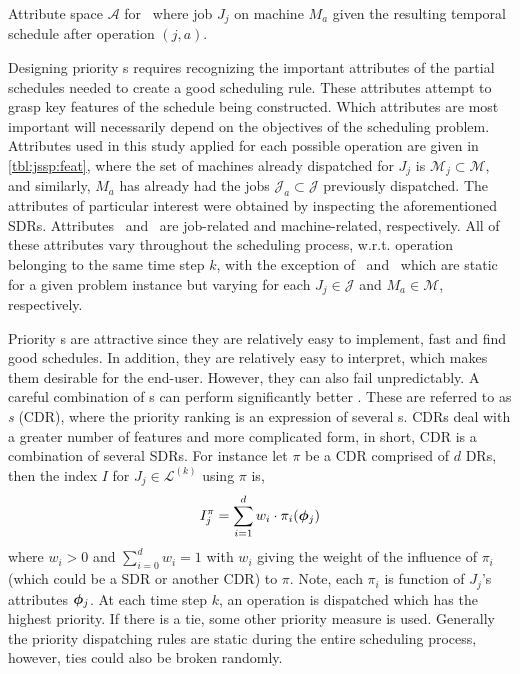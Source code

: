 \documentclass[smallextended]{svjour3}
\begin{document}
\begin{table}[t!] \centering
	\caption[Attribute space $\mathcal{A}$ for \JSP]{Attribute space 
	$\mathcal{A}$ for \JSP\ where job $J_j$ on machine $M_a$ given the 
	resulting temporal schedule after operation $(j,a)$.
	}
	\label{tbl:jssp:feat}
	
\end{table}

Designing priority \dr s requires recognizing the important 
attributes of the partial schedules needed to create a good scheduling rule. 
These attributes attempt to grasp key features of the schedule being 
constructed. Which attributes are most important will necessarily depend on the
objectives of the scheduling problem. Attributes used in this study applied for 
each possible operation are given in \cref{tbl:jssp:feat}, where the set of 
machines already dispatched for $J_j$ is $\mathcal{M}_j\subset\mathcal{M}$, 
and similarly, $M_a$ has already had the jobs $\mathcal{J}_a\subset\mathcal{J}$ 
previously dispatched.
The attributes of particular interest were obtained by inspecting the 
aforementioned SDRs. Attributes \phiJobRelated\ and \phiMacRelated\ are 
job-related and machine-related, respectively.
All of these attributes vary throughout the scheduling process, w.r.t. 
operation belonging to the same time step $k$, with the exception of 
\phijobTotProcTime\ and \phimacTotProcTime\ which are static for a given 
problem instance but varying for each $J_j\in\mathcal{J}$ and 
$M_a\in\mathcal{M}$, respectively. 

Priority \dr s are attractive since they are relatively easy to 
implement, 
fast and find good schedules. In addition, they are relatively easy to 
interpret, which makes them desirable for the end-user.
However, they can also fail unpredictably. 
A careful combination of \dr s can perform significantly better 
\cite{Jayamohan04}. These are referred to as \emph{\cdr s} 
(CDR), where the priority ranking is an expression of several \sdr s. 
CDRs deal with a greater number of features and 
more complicated form, in short, CDR is a combination of several SDRs. For 
instance let $\pi$ be a CDR comprised of $d$ DRs, then 
the index $I$ for $J_j\in\mathcal{L}^{(k)}$ using $\pi$ is, 
\begin{equation}
	I_j^{\pi} = \sum_{i=1}^d w_i \cdot \pi_i(\bm{\phi}_j) \label{eq:CDR}
\end{equation}
where $w_i>0$ and $\sum_{i=0}^d w_i = 1$ with $w_i$ giving the weight of the 
influence of $\pi_i$ (which could be a SDR or another CDR) to $\pi$. Note, 
each $\pi_i$ is function of $J_j$'s attributes $\bm{\phi}_j$.  
At each time step $k$, an operation is dispatched which has the highest 
priority.  If there is a 
tie, some other priority measure is used. Generally the priority dispatching 
rules are static during the entire scheduling process, however, ties could also 
be broken randomly. 
\end{document}
